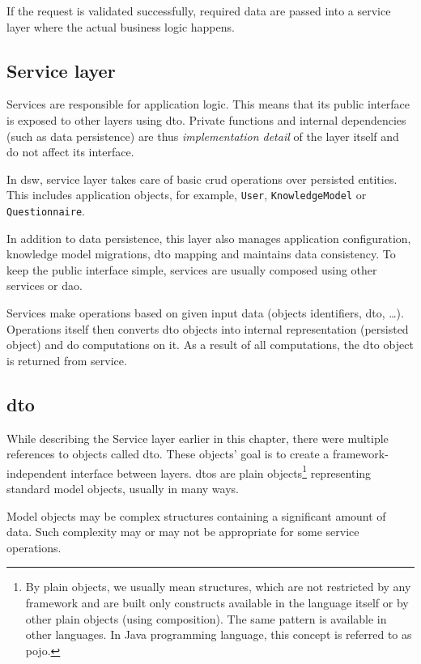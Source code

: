 If the request is validated successfully, required data are passed into a service layer where the actual business logic happens.

\subsection{Service layer}
Services are responsible for application logic.
This means that its public interface is exposed to other layers using \gls{dto}.
Private functions and internal dependencies (such as data persistence) are thus \textit{implementation detail} of the layer itself and do not affect its interface.

In \gls{dsw}, service layer takes care of basic \gls{crud} operations over persisted entities.
This includes application objects, for example, \texttt{User}, \texttt{KnowledgeModel} or \texttt{Questionnaire}.

In addition to data persistence, this layer also manages application configuration, knowledge model migrations, \gls{dto} mapping and maintains data consistency.
To keep the public interface simple, services are usually composed using other services or \gls{dao}.

Services make operations based on given input data (objects identifiers, \gls{dto}, \dots).
Operations itself then converts \gls{dto} objects into internal representation (persisted object) and do computations on it.
As a result of all computations, the \gls{dto} object is returned from service.

\subsection{\gls{dto}}
While describing the Service layer earlier in this chapter, there were multiple references to objects called \gls{dto}.
These objects' goal is to create a framework-independent interface between layers.
\gls{dto}s are plain objects\footnote{By plain objects, we usually mean structures, which are not restricted by any framework and are built only constructs available in the language itself or by other plain objects (using composition). The same pattern is available in other languages. In Java programming language, this concept is referred to as \gls{pojo}\cite{wiki-pojo}.} representing standard model objects, usually in many ways.

Model objects may be complex structures containing a significant amount of data.
Such complexity may or may not be appropriate for some service operations.


